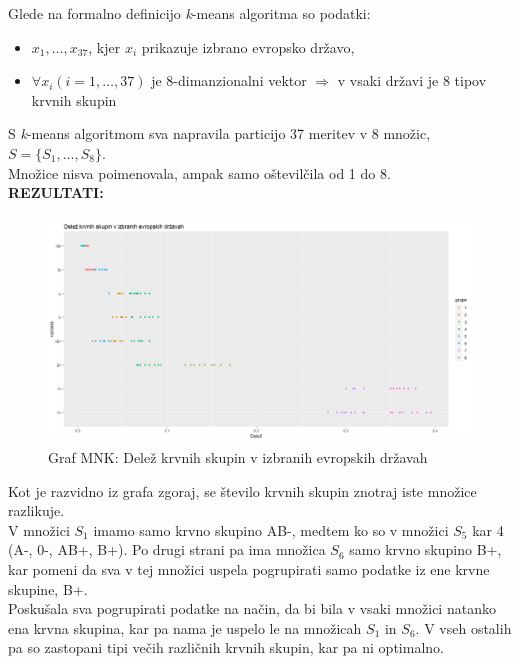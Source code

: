 \documentclass[11pt, a4paper]{article}
\begin{document}
\noindent Glede na formalno definicijo \textsl{k}-means algoritma so podatki: \\
\begin{itemize}
	\item $ x_1,…,x_{37}$, kjer $x_i$ prikazuje izbrano evropsko državo,\\
	\item $\forall x_i  (i = 1,\ldots, 37)$ je 8-dimanzionalni vektor $\Rightarrow$ v vsaki državi je 8 tipov krvnih skupin \\
\end{itemize}
 S \textsl{k}-means algoritmom sva napravila particijo 37 meritev v 8 množic, \\ $ S = \{S_1, \ldots, S_8\}$. \\
 Množice nisva poimenovala, ampak samo oštevilčila od 1 do 8. \\

\noindent \textbf{REZULTATI:} \\

\begin{figure}[h]
\caption{Graf MNK: Delež krvnih skupin v izbranih evropskih državah}
\centering
\includegraphics[width=12cm, height=6cm]{grafMNKkri}
\end{figure}

\noindent Kot je razvidno iz grafa zgoraj, se število krvnih skupin znotraj iste množice razlikuje. \\
V množici $S_1$ imamo samo krvno skupino AB-, medtem ko so v množici $S_5$ kar 4 (A-, 0-, AB+, B+). Po drugi strani pa ima množica $S_6$ samo krvno skupino B+, kar pomeni da sva v tej množici uspela pogrupirati samo podatke iz ene krvne skupine, B+.\\

\noindent Poskušala sva pogrupirati podatke na način, da bi bila v vsaki množici natanko ena krvna skupina, kar pa nama je uspelo le na množicah $S_1$ in $S_6$. V vseh ostalih pa so zastopani tipi večih različnih krvnih skupin, kar pa ni optimalno.
\end{document}
